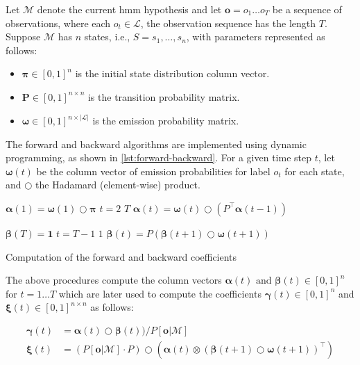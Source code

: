 Let $\mathcal{M}$ denote the current \gls{hmm} hypothesis and let $\mathbf{o} = o_1 \dots o_T$ be a sequence of observations, where each $o_t \in \mathcal{L}$, the observation sequence has the length $T$. Suppose $\mathcal{M}$ has $n$ states, i.e., $S = {s_1, \dots, s_n}$, with parameters represented as follows:
\begin{itemize}
    \item $\pmb{\pi} \in [0,1]^{n}$ is the initial state distribution column vector.
    \item $\pmb{P} \in [0,1]^{n \times n}$ is the transition probability matrix.
    \item $\pmb{\omega} \in [0,1]^{n \times |\mathcal{L}|}$ is the emission probability matrix.
\end{itemize}

The forward and backward algorithms are implemented using dynamic programming, as shown in \autoref{lst:forward-backward}.
For a given time step $t$, let $\pmb{\omega}(t)$ be the column vector of emission probabilities for label $o_t$ for each state, and $\bigcirc$ the Hadamard (element-wise) product.

\begin{listing}[htb!]
    \begin{codebox}
        \li $\pmb{\alpha}(1) = \pmb{\omega}(1) \bigcirc \pmb{\pi}$
        \li \For $t = 2$ \To $T$ \Do
        \li $\pmb{\alpha}(t) = \pmb{\omega}(t) \bigcirc \left( P^\top \pmb{\alpha}(t-1) \right)$
        \End
    \end{codebox}
    \begin{codebox}
        \li $\pmb{\beta}(T) = \mathbf{1}$
        \li \For $t = T-1$ \To $1$ \Do
        \li $\pmb{\beta}(t) = P \left( \pmb{\beta}(t+1) \bigcirc \pmb{\omega}(t+1) \right)$
        \End
    \end{codebox}
    \caption{Computation of the forward and backward coefficients}
    \label{lst:forward-backward}
\end{listing}


The above procedures compute the column vectors $\pmb{\alpha}(t) \text{ and } \pmb{\beta}(t) \in [0,1]^{n}$ for $t = 1\dots T$ which are later used to compute the coefficients $\pmb{\gamma}(t) \in [0,1]^{n}$ and $\pmb{\xi}(t) \in [0,1]^{n \times n}$ as follows:


\begin{align*}
    \pmb{\gamma}(t) & = \pmb{\alpha}(t) \bigcirc \pmb{\beta}(t)) / P[\mathbf{o} | \mathcal{M}]                                                                   \\%
    \pmb{\xi}(t)    & = (P[\mathbf{o} | \mathcal{M}] \cdot P) \bigcirc \left( \pmb{\alpha}(t) \otimes (\pmb{\beta}(t+1) \bigcirc \pmb{\omega}(t+1))^\top \right) %
\end{align*}


